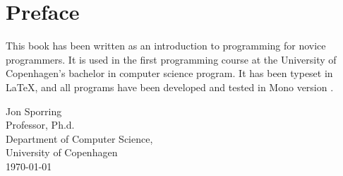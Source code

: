 \documentclass[fsharpnotes.tex]{subfiles}
\begin{document}
\chapter{Preface}
This book has been written as an introduction to programming for novice programmers. It is used in the first programming course at the University of Copenhagen's bachelor in computer science program. It has been typeset in \LaTeX, and all programs have been developed and tested in Mono version \monoVersion.


\vspace*{1cm}
Jon Sporring\\
Professor, Ph.d.\\
Department of Computer Science,\\
University of Copenhagen\\
\today\\
\end{document}
